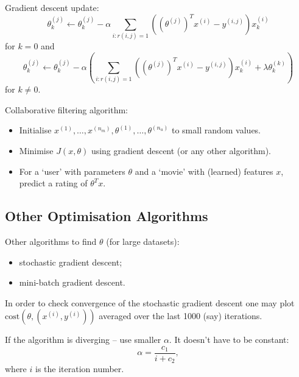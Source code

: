 \documentclass[a4paper,11pt]{article}
\begin{document}
Gradient descent update:
\begin{equation}
\theta_k ^{(j)} \leftarrow \theta_k ^{(j)} - \alpha \sum_{i:r(i,j)=1} \left(\left(\theta^{(j)} \right)^T x^{(i)} - y^{(i,j)} \right) x_k ^{(i)}
\end{equation}
for \textcolor{OliveGreen}{$k=0$} and
\begin{equation}
\theta_k ^{(j)} \leftarrow \theta_k ^{(j)} - \alpha \left( \sum_{i:r(i,j)=1} \left(\left(\theta^{(j)} \right)^T x^{(i)} - y^{(i,j)} \right) x_k ^{(i)} + \lambda \theta_k ^{(k)} \right)
\end{equation}
for \textcolor{OliveGreen}{$k \neq 0$}.

Collaborative filtering algorithm:
\begin{itemize}
\item Initialise \textcolor{OliveGreen}{$x^{(1)}, \ldots, x^{(n_m)}, \theta^{(1)}, \ldots, \theta^{(n_u)}$} to small random values.
\item Minimise \textcolor{OliveGreen}{$J \left( x, \theta \right)$} using gradient descent (or any other algorithm).
\item For a `user' with parameters \textcolor{OliveGreen}{$\theta$} and a `movie' with (learned) features \textcolor{OliveGreen}{$x$}, predict a rating of \textcolor{OliveGreen}{$\theta^T x$}.
\end{itemize}
\subsection{Other Optimisation Algorithms}
Other algorithms to find \textcolor{OliveGreen}{$\theta$} (for large datasets):
\begin{itemize}
\item stochastic gradient descent;
\item mini-batch gradient descent.
\end{itemize}

In order to check convergence of the stochastic gradient descent one may plot \textcolor{OliveGreen}{$\text{cost} \left( \theta , \left(x^{(i)}, y^{(i)} \right) \right)$} averaged over the last 1000 (say) iterations.

If the algorithm is diverging -- use smaller \textcolor{OliveGreen}{$\alpha$}. It doesn't have to be constant:
\begin{equation}
\alpha = \frac{c_1}{i + c_2} ,
\end{equation}
where \textcolor{OliveGreen}{$i$} is the iteration number.
\end{document}
